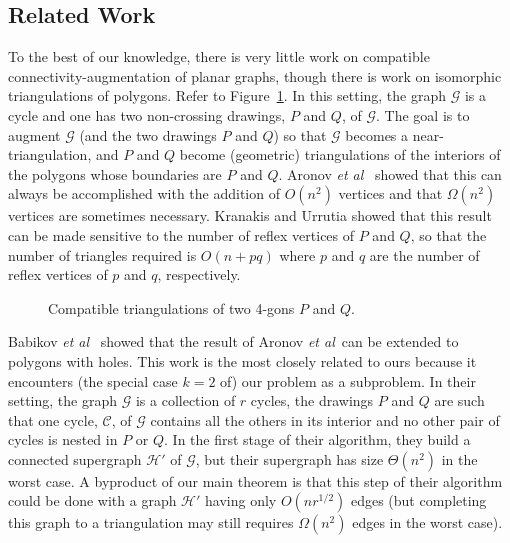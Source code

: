 \documentclass{patmorin}
\newcommand{\etal}{\emph{et al}}
\begin{document}
\subsection{Related Work}

To the best of our knowledge, there is very little work on
compatible connectivity-augmentation of planar graphs, though
there is work on isomorphic triangulations of polygons.  Refer to
Figure~\ref{fig:compatible-triangs}.  In this setting, the graph
$\mathcal{G}$ is a cycle and one has two non-crossing drawings, $P$
and $Q$, of $\mathcal G$. The goal is to augment $\mathcal G$ (and the
two drawings $P$ and $Q$) so that $\mathcal G$ becomes a near-triangulation,
and $P$ and $Q$ become (geometric) triangulations of the interiors
of the polygons whose boundaries are $P$ and $Q$.  Aronov \etal\
\cite{aronov.seidel.ea:compatible} showed that this can always
be accomplished with the addition of $O(n^2)$ vertices and that
$\Omega(n^2)$ vertices are sometimes necessary.  Kranakis and Urrutia
\cite{kranakis.urrutia:isomorphic} showed that this result can be made
sensitive to the number of reflex vertices of $P$ and $Q$, so that the
number of triangles required is $O(n+pq)$ where $p$ and $q$ are the
number of reflex vertices of $p$ and $q$, respectively.

\begin{figure}
  \caption{Compatible triangulations of two 4-gons $P$ and $Q$.}
  \label{fig:compatible-triangs}
\end{figure}

Babikov \etal\ \cite{babikov.souvaine.ea:constructing} showed that the result of Aronov \etal\ can be extended to polygons with holes. This work is the most closely related to ours because it encounters (the special case $k=2$ of) our problem as a subproblem. In their setting, the graph $\mathcal G$ is a collection of $r$ cycles, the drawings $P$ and $Q$ are such that one cycle, $\mathcal C$, of $\mathcal G$ contains all the others in its interior and no other pair of cycles is nested in $P$ or $Q$. In the first stage of their algorithm, they build a connected supergraph $\mathcal{H}'$ of $\mathcal{G}$, but their supergraph has size $\Theta(n^2)$ in the worst case.  A byproduct of our main theorem is that this step of their algorithm could be done with a graph $\mathcal{H}'$ having only $O(nr^{1/2})$ edges (but completing this graph to a triangulation may still requires $\Omega(n^2)$ edges in the worst case).
\end{document}
